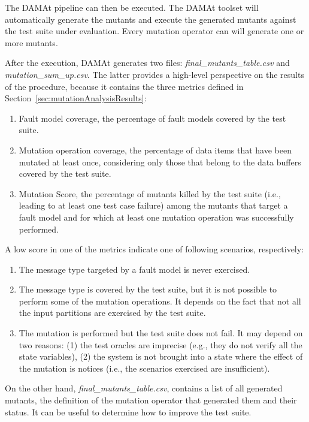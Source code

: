 The DAMAt pipeline can then be executed. The DAMAt toolset will automatically generate the mutants and execute the generated mutants against the test suite under evaluation.
Every mutation operator can will generate one or more mutants.

\ENDCHANGEDFINAL


After the execution, DAMAt generates two files: \emph{final\_mutants\_table.csv} and \emph{mutation\_sum\_up.csv}.
The latter provides a high-level perspective on the results of the procedure, because it contains the three metrics defined in Section~\ref{sec:mutationAnalysisResults}:
\begin{enumerate}
\item Fault model coverage, the percentage of fault models covered by the test suite.
\item Mutation operation coverage, the percentage of data items that have been mutated at least once, considering only those that belong to the data buffers covered by the test suite.
\item Mutation Score, the percentage of mutants killed by the test suite (i.e., leading to at least one test case failure) among the mutants that target a fault model and for which at least one mutation operation was successfully performed.
\end{enumerate}


A low score in one of the metrics indicate one of following scenarios, respectively:
\begin{enumerate}
\item The message type targeted by a fault model is never exercised.
\item The message type is covered by the test suite, but it is not possible to perform some of the mutation operations. It depends on the fact that not all the input partitions are exercised by the test suite.
\item The mutation is performed but the test suite does not fail. It may depend on two reasons: (1) the test oracles are imprecise (e.g., they do not verify all the state variables), (2) the system is not brought into a state where the effect of the mutation is notices (i.e., the scenarios exercised are insufficient).
\end{enumerate}

\STARTCHANGEDFINAL

On the other hand, \emph{final\_mutants\_table.csv}, contains a list of all generated mutants, the definition of the mutation operator that generated them and their status. It can be useful to determine how to improve the test suite.

